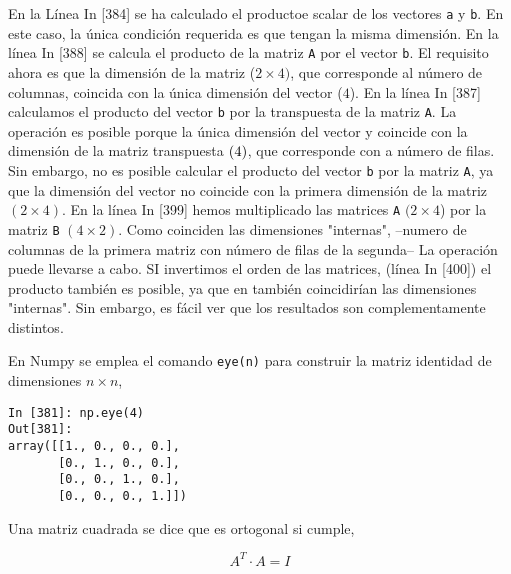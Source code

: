 \begin{paracol}{2}
En la Línea In [384] se ha calculado el productoe scalar de los vectores \texttt{a} y \texttt{b}. En este caso, la única condición requerida es que tengan la misma dimensión. En la línea In [388] se calcula el producto de la matriz \texttt{A} por el vector \texttt{b}. El requisito ahora es que la dimensión de la matriz ($2\times 4)$, que corresponde al número de columnas, coincida con la única dimensión del vector ($4$). En la línea In [387] calculamos el producto del vector \texttt{b} por la transpuesta de la matriz \texttt{A}. La operación es posible porque la única dimensión del vector y coincide con la dimensión  de la matriz transpuesta $(4\time2)$, que corresponde con a número de filas. Sin embargo, no es posible calcular el producto del vector \texttt{b} por la matriz \texttt{A}, ya que la dimensión del vector no coincide con la primera dimensión de la matriz $(2\times4)$. En la línea In [399] hemos multiplicado las matrices \texttt{A} $(2\times 4$) por la matriz \texttt{B} $(4\times 2)$. Como coinciden las dimensiones "internas", --numero de columnas de la primera matriz con número de filas de la segunda-- La operación puede llevarse a cabo. SI invertimos el orden de las matrices, (línea In [400]) el producto también es posible, ya que en también coincidirían las dimensiones "internas". Sin embargo, es fácil ver que los resultados son complementamente distintos.

En Numpy se emplea el comando \texttt{eye(n)} para construir la matriz identidad de dimensiones $n\times n$,    
\end{paracol}

\begin{center}
    \begin{minipage}{0.3\textwidth}
        \begin{verbatim}
In [381]: np.eye(4)
Out[381]: 
array([[1., 0., 0., 0.],
       [0., 1., 0., 0.],
       [0., 0., 1., 0.],
       [0., 0., 0., 1.]])
        \end{verbatim}
    \end{minipage}
\end{center}
\begin{paracol}{2}
Una matriz cuadrada se dice que es ortogonal si cumple,    
\end{paracol}
\begin{equation*}
A^T\cdot A=I
\end{equation*}

